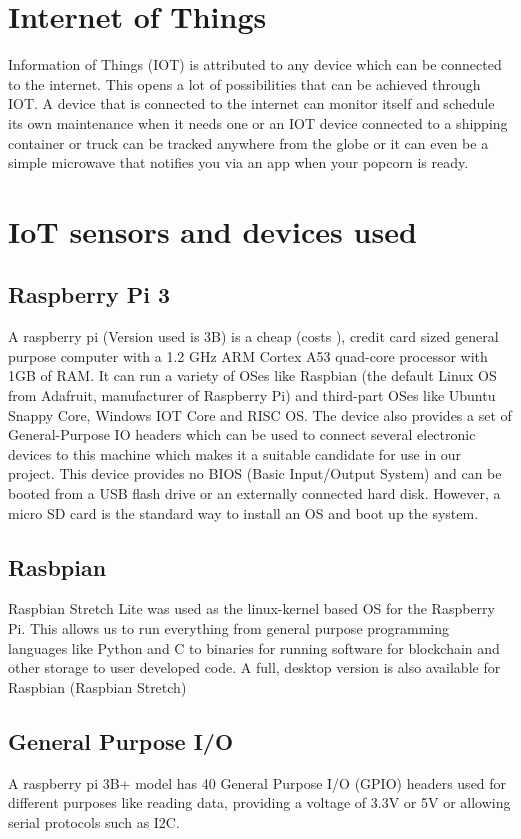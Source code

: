 \documentclass[11pt,openright]{report}
\begin{document}
\section{Internet of Things}
Information of Things (IOT) is attributed to any device which can be connected to the internet. This opens a lot of possibilities that can be achieved through IOT. A device that is connected to the internet can monitor itself and schedule its own maintenance when it needs one or an IOT device connected to a shipping container or truck can be tracked anywhere from the globe or it can even be a simple microwave that notifies you via an app when your popcorn is ready.

\section{IoT sensors and devices used}
\subsection{Raspberry Pi 3}
A raspberry pi (Version used is 3B) is a cheap (costs ), credit card sized general purpose computer with a 1.2 GHz ARM Cortex A53 quad-core processor with 1GB of RAM. It can run a variety of OSes like Raspbian (the default Linux OS from Adafruit, manufacturer of Raspberry Pi) and third-part OSes like Ubuntu Snappy Core, Windows IOT Core and RISC OS. The device also provides a set of General-Purpose IO headers which can be used to connect several electronic devices to this machine which makes it a suitable candidate for use in our project. This device provides no BIOS (Basic Input/Output System) and can be booted from a USB flash drive or an externally connected hard disk. However, a micro SD card is the standard way to install an OS and boot up the system.  

\subsection{Rasbpian}
Raspbian Stretch Lite was used as the linux-kernel based OS for the Raspberry Pi. This allows us to run everything from general purpose programming languages like Python and C to binaries for running software for blockchain and other storage to user developed code. A full, desktop version is also available for Raspbian (Raspbian Stretch)

\subsection{General Purpose I/O}
A raspberry pi 3B+ model has 40 General Purpose I/O (GPIO) headers used for different purposes like reading data, providing a voltage of 3.3V or 5V or allowing serial protocols such as I2C.
\end{document}
